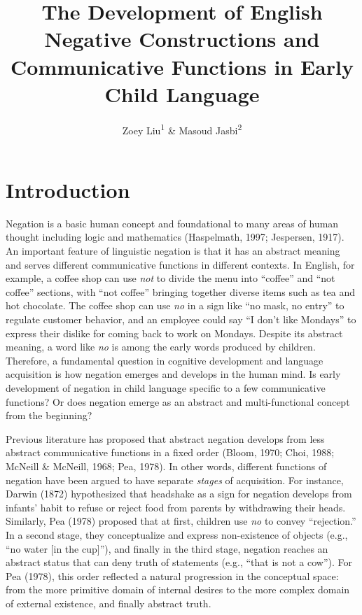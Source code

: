 \documentclass[
  english,
  man,floatsintext]{apa6}
\title{The Development of English Negative Constructions and Communicative Functions in Early Child Language}
\author{Zoey Liu\textsuperscript{1} \& Masoud Jasbi\textsuperscript{2}}
\date{}
\affiliation{\vspace{0.5cm}\textsuperscript{1} Boston College\\\textsuperscript{2} Uinversity of California, Davis}
\begin{document}
\maketitle

\hypertarget{introduction}{%
\section{Introduction}\label{introduction}}

Negation is a basic human concept and foundational to many areas of human thought including logic and mathematics (Haspelmath, 1997; Jespersen, 1917). An important feature of linguistic negation is that it has an abstract meaning and serves different communicative functions in different contexts. In English, for example, a coffee shop can use \emph{not} to divide the menu into ``coffee'' and ``not coffee'' sections, with ``not coffee'' bringing together diverse items such as tea and hot chocolate. The coffee shop can use \emph{no} in a sign like ``no mask, no entry'' to regulate customer behavior, and an employee could say ``I don't like Mondays'' to express their dislike for coming back to work on Mondays. Despite its abstract meaning, a word like \emph{no} is among the early words produced by children. Therefore, a fundamental question in cognitive development and language acquisition is how negation emerges and develops in the human mind. Is early development of negation in child language specific to a few communicative functions? Or does negation emerge as an abstract and multi-functional concept from the beginning?

Previous literature has proposed that abstract negation develops from less abstract communicative functions in a fixed order (Bloom, 1970; Choi, 1988; McNeill \& McNeill, 1968; Pea, 1978). In other words, different functions of negation have been argued to have separate \emph{stages} of acquisition. For instance, Darwin (1872) hypothesized that headshake as a sign for negation develops from infants' habit to refuse or reject food from parents by withdrawing their heads. Similarly, Pea (1978) proposed that at first, children use \emph{no} to convey ``rejection.'' In a second stage, they conceptualize and express non-existence of objects (e.g., ``no water {[}in the cup{]}''), and finally in the third stage, negation reaches an abstract status that can deny truth of statements (e.g., ``that is not a cow''). For Pea (1978), this order reflected a natural progression in the conceptual space: from the more primitive domain of internal desires to the more complex domain of external existence, and finally abstract truth.
\end{document}
